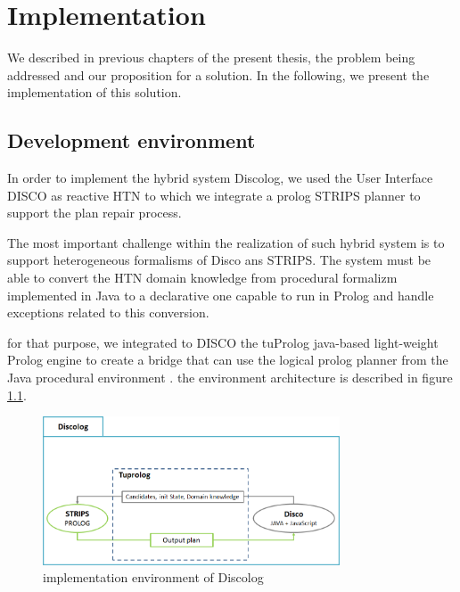 
\chapter{Implementation} %

\label{Chapter 5} %

We described in previous chapters of the present thesis, the  problem  being addressed and our proposition for a solution. In the following, we present the implementation of this solution. 

\section{Development environment }
In order to implement the hybrid system Discolog, we used the  User Interface  DISCO \cite{rich2009building} as reactive HTN to which we integrate a prolog STRIPS planner to support the plan repair process. 

The most important challenge within the realization of such hybrid system is to support heterogeneous formalisms of Disco ans STRIPS. The system must be able to convert  the HTN domain knowledge from procedural formalizm implemented in Java to a declarative one capable to run in Prolog  and  handle exceptions related to this conversion. 

for that purpose, we integrated to DISCO the tuProlog  java-based light-weight Prolog engine to create a bridge that can use the logical prolog planner from the Java procedural environment . the environment architecture is described  in figure \ref{implementation environment of Discolog}.
	\begin{figure}[h]
		\centering
		\includegraphics[width=250pt]{Pictures/archi1.png}
		\caption{\label{implementation environment of Discolog} implementation environment of Discolog}
	\end{figure}
